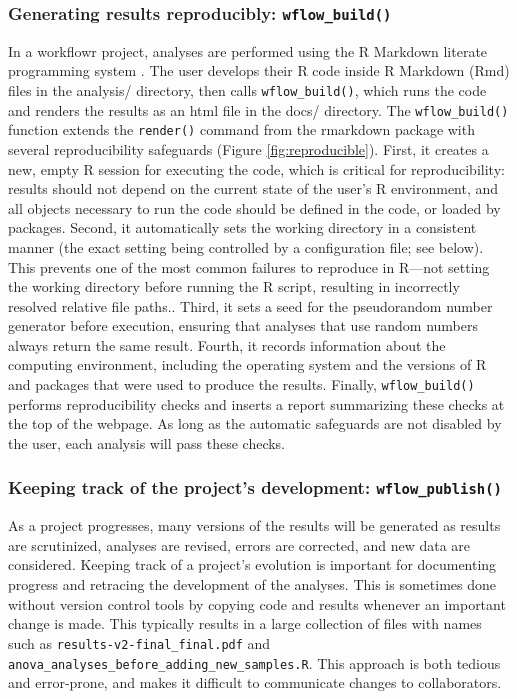 \documentclass[9pt,a4paper]{extarticle}
\begin{document}
\subsubsection*{Generating results reproducibly: \texttt{wflow\_build()}}

In a workflowr project, analyses are performed using the R Markdown
literate programming system \cite{Xie2018}. The user develops their R
code inside R Markdown (Rmd) files in the analysis/ directory, then
calls \texttt{wflow\_build()}, which runs the code and renders the results as an
html file in the docs/ directory. The \texttt{wflow\_build()} function extends the
\texttt{render()} command from the rmarkdown package with several reproducibility
safeguards (Figure \ref{fig:reproducible}). First, it creates a new, empty R session for
executing the code, which is critical for reproducibility: results
should not depend on the current state of the user's R environment, and
all objects necessary to run the code should be defined in the code, or
loaded by packages. Second, it automatically sets the working directory
in a consistent manner (the exact setting being controlled by a
configuration file; see below). This prevents one of the most common
failures to reproduce in R—not setting the working directory before
running the R script, resulting in incorrectly resolved relative file
paths.. Third, it sets a seed for the pseudorandom number generator
before execution, ensuring that analyses that use random numbers always
return the same result. Fourth, it records information about the
computing environment, including the operating system and the versions
of R and packages that were used to produce the results. Finally,
\texttt{wflow\_build()} performs reproducibility checks and inserts a report
summarizing these checks at the top of the webpage. As long as the
automatic safeguards are not disabled by the user, each analysis will
pass these checks.

\subsubsection*{Keeping track of the project's development: \texttt{wflow\_publish()}}

As a project progresses, many versions of the results will be generated
as results are scrutinized, analyses are revised, errors are corrected,
and new data are considered. Keeping track of a project's evolution is
important for documenting progress and retracing the development of the
analyses. This is sometimes done without version control tools by
copying code and results whenever an important change is made. This
typically results in a large collection of files with names such as
\texttt{results-v2-final\_final.pdf} and
\texttt{anova\_analyses\_before\_adding\_new\_samples.R}. This approach
is both tedious and error-prone, and makes it difficult to communicate
changes to collaborators.
\end{document}

